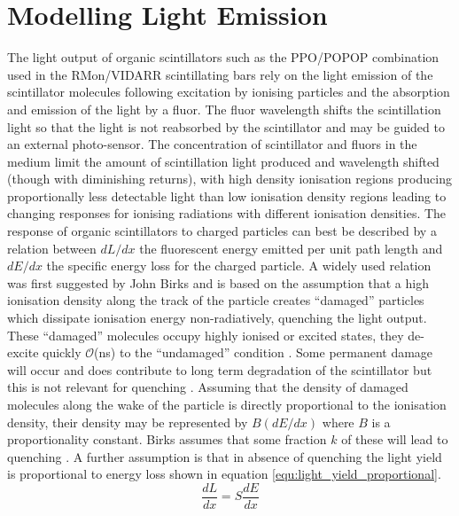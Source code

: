 \section{Modelling Light Emission}\label{sec:GEANT4Simulation_ModellingLightEmission}
The light output of organic scintillators such as the PPO/POPOP combination used in the RMon/VIDARR scintillating bars rely on the light emission of the scintillator molecules following excitation by ionising particles and the absorption and emission of the light by a fluor. The fluor wavelength shifts the scintillation light so that the light is not reabsorbed by the scintillator and may be guided to an external photo-sensor. The concentration of scintillator and fluors in the medium limit the amount of scintillation light produced and wavelength shifted (though with diminishing returns), with high density ionisation regions producing proportionally less detectable light than low ionisation density regions leading to changing responses for ionising radiations with different ionisation densities. The response of organic scintillators to charged particles can best be described by a relation between $dL/dx$ the fluorescent energy emitted per unit path length and $dE/dx$ the specific energy loss for the charged particle. A widely used relation was first suggested by John Birks \cite{birks_1964} and is based on the assumption that a high ionisation density along the track of the particle creates ``damaged'' particles which dissipate ionisation energy non-radiatively, quenching the light output. These “damaged” molecules occupy highly ionised or excited states, they de-excite quickly $\mathcal{O}$(ns) to the “undamaged” condition \cite{knoll_2010}. Some permanent damage will occur and does contribute to long term degradation of the scintillator but this is not relevant for quenching \cite{knoll_2010}. Assuming that the density of damaged molecules along the wake of the particle is directly proportional to the ionisation density, their density may be represented by $B(dE/dx)$ where $B$ is a proportionality constant. Birks assumes that some fraction $k$ of these will lead to quenching \cite{craun_1970}. A further assumption is that in absence of quenching the light yield is proportional to energy loss shown in equation \ref{equ:light_yield_proportional}.
\begin{equation}
\frac{dL}{dx} = S\frac{dE}{dx}
\label{equ:light_yield_proportional}
\end{equation}
